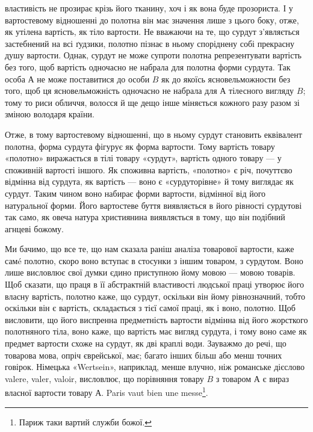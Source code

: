 \parcont{}  %
властивість не прозирає крізь його тканину, хоч і як вона буде
прозориста. І у вартостевому відношенні до полотна він має значення
лише з цього боку, отже, як утілена вартість, як тіло вартости.
Не вважаючи на те, що сурдут з’являється застебнений на
всі ґудзики, полотно пізнає в ньому споріднену собі прекрасну
душу вартости. Однак, сурдут не може супроти полотна репрезентувати
вартість без того, щоб вартість одночасно не набрала
для полотна форми сурдута. Так особа $А$ не може поставитися до
особи $B$ як до якоїсь ясновельможности без того, щоб ця ясновельможність
одночасно не набрала для $А$ тілесного вигляду $B$;
тому то риси обличчя, волосся й ще дещо інше міняється кожного
разу разом зі зміною володаря країни.

Отже, в тому вартостевому відношенні, що в ньому сурдут
становить еквівалент полотна, форма сурдута фігурує як форма
вартости. Тому вартість товару «полотно» виражається в тілі
товару «сурдут», вартість одного товару — у споживній вартості
іншого. Як споживна вартість, «полотно» є річ, почуттєво відмінна
від сурдута, як вартість — воно є «сурдуторівне» й тому
виглядає як сурдут. Таким чином воно набирає форми вартости,
відмінної від його натуральної форми. Його вартостеве буття
виявляється в його рівності сурдутові так само, як овеча натура
християнина виявляється в тому, що він подібний агнцеві божому.

Ми бачимо, що все те, що нам сказала раніш аналіза товарової
вартости, каже самé полотно, скоро воно вступає в стосунки з
іншим товаром, з сурдутом. Воно лише висловлює свої думки єдино
приступною йому мовою — мовою товарів. Щоб сказати, що
праця в її абстрактній властивості людської праці утворює його
власну вартість, полотно каже, що сурдут, оскільки він йому
рівнозначний, тобто оскільки він є вартість, складається з тієї
самої праці, як і воно, полотно. Щоб висловити, що його виспренна
предметність вартости відмінна від його жорсткого полотняного
тіла, воно каже, що вартість має вигляд сурдута, і тому
воно саме як предмет вартости схоже на сурдут, як дві краплі
води. Зауважмо до речі, що товарова мова, опріч єврейської, має;
багато інших більш або менш точних говірок. Німецька «Wertsein»,
наприклад, менше влучно, ніж романське дієслово valere,
valer, valoir, висловлює, що порівняння товару $B$ з товаром $А$ є
вираз власної вартости товару $А$. Paris vaut bien une messe\footnote*{
Париж таки вартий служби божої. 
}.

